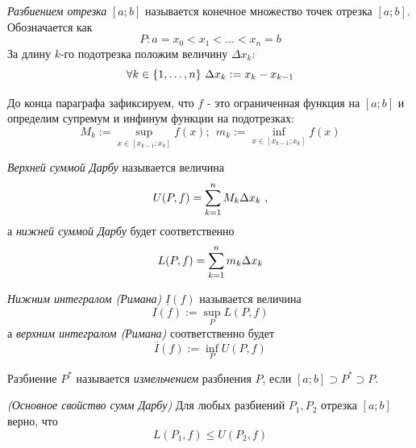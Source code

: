 
\begin{definition}
	\textit{Разбиением отрезка} $[a; b]$ называется конечное множество точек отрезка $[a; b]$. Обозначается как
	\[
		P: a = x_0 < x_1 < \ldots < x_n = b
	\]
	За длину $k$-го подотрезка положим величину $\Delta x_k$:
	\[
		\forall k \in \{1, \ldots, n\}\ \Delta x_k := x_k - x_{k - 1}
	\]
\end{definition}

\begin{note}
	До конца параграфа зафиксируем, что $f$ - это ограниченная функция на $[a; b]$ и определим супремум и инфинум функции на подотрезках:
	\[
		M_k := \sup\limits_{x \in [x_{k - 1}; x_k]} f(x);\ \ m_k := \inf\limits_{x \in [x_{k - 1}; x_k]} f(x)
	\]
\end{note}


\begin{definition}
	\textit{Верхней суммой Дарбу} называется величина
	\[
		U(P, f) = \suml_{k = 1}^n M_k \Delta x_k\ ,
	\]
	а \textit{нижней суммой Дарбу} будет соответственно
	\[
		L(P, f) = \sum\limits_{k = 1}^n m_k \Delta x_k
	\]
\end{definition}

\begin{definition}
	\textit{Нижним интегралом (Римана)} $\underline{I}(f)$ называется величина
	\[
		\underline{I}(f) := \sup\limits_{P} L(P, f)
	\]
	а \textit{верхним интегралом (Римана)} соответственно будет
	\[
		\overline{I}(f) := \inf\limits_{P} U(P, f)
	\]
\end{definition}

\begin{definition}
	Разбиение $P^*$ называется \textit{измельчением} разбиения $P$, если $[a; b] \supset P^* \supset P$.
\end{definition}

\begin{theorem}
	\textit{(Основное свойство сумм Дарбу)}
	Для любых разбиений $P_1, P_2$ отрезка $[a; b]$ верно, что
	\[
		L(P_1, f) \le U(P_2, f)
	\]
\end{theorem}

